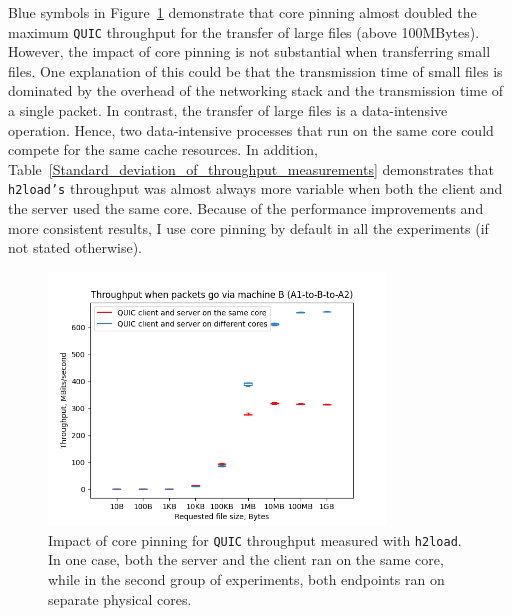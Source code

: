\documentclass[12pt,a4paper]{report}
\newcommand\note[2]{{\color{#1}\bf #2}}
\newcommand\simon[1]{\ifcomments{\note{cyan}{SM: #1}}\fi}
\begin{document}
Blue symbols in Figure~\ref{fig:Throughput_via_A-to-B-to-A_MTU=1500} demonstrate that core pinning almost doubled the maximum \texttt{QUIC} throughput for the transfer of large files (above 100MBytes).
However, the impact of core pinning is not substantial when transferring small files.
One explanation of this could be that the transmission time of small files is dominated by the overhead of the networking stack and the transmission time of a single packet.
In contrast, the transfer of large files is a data-intensive operation.
Hence, two data-intensive processes that run on the same core could compete for the same cache resources.
In addition, Table~\ref{Standard_deviation_of_throughput_measurements} demonstrates that \texttt{h2load's} throughput was almost always more variable when both the client and the server used the same core.
Because of the performance improvements and more consistent results, I use core pinning by default in all the experiments (if not stated otherwise).

    \begin{figure}[htb]
    \centering
    \includegraphics[width=0.8\textwidth]{figs/QUIC Throughput when packets go via machine B (A1-to-B-to-A2).png}
    \caption[Impact of core pinning for \texttt{QUIC} throughput measured with \texttt{h2load}]{Impact of core pinning for \texttt{QUIC} throughput measured with \texttt{h2load}. In one case, both the server and the client ran on the same core, while in the second group of experiments, both endpoints ran on separate physical cores.}
    \label{fig:Throughput_via_A-to-B-to-A_MTU=1500}
    \end{figure}
\end{document}
